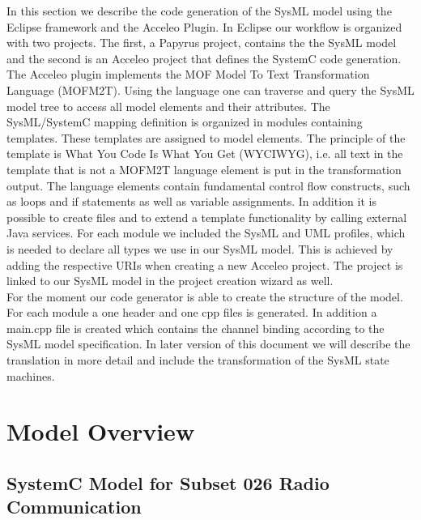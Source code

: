 \documentclass{template/openetcs_article}
\begin{document}
In this section we describe the code generation of the SysML model using the Eclipse framework and the Acceleo Plugin.
In Eclipse our workflow is organized with two projects. The first, a Papyrus project, contains the the SysML model and the second is an Acceleo project that defines the SystemC code generation. The Acceleo plugin implements the MOF Model To Text Transformation Language (MOFM2T). Using the language one can traverse and query the SysML model tree to access all model elements and their attributes. The SysML/SystemC mapping definition is organized in modules containing templates. These templates are assigned to model elements. The principle of the template is What You Code Is What You Get (WYCIWYG), i.e. all text in the template that is not a MOFM2T language element is put in the transformation output. The language elements contain fundamental control flow constructs, such as loops and if statements as well as variable assignments. In addition it is possible to create files and to extend a template functionality by calling external Java services. For each module we included the SysML and UML profiles, which is needed to declare all types we use in our SysML model. This is achieved by adding the respective URIs when creating a new Acceleo project. The project is linked to our SysML model in the project creation wizard as well.\\

For the moment our code generator is able to create the structure of the model. For each module a one header and one cpp files is generated. In addition a main.cpp file is created which contains the channel binding according to the SysML model specification. In later version of this document we will describe the translation in more detail and include the transformation of the SysML state machines.


\section{Model Overview}
\label{sec:model-overview}

\subsection{SystemC Model for Subset 026 Radio Communication}
\end{document}
